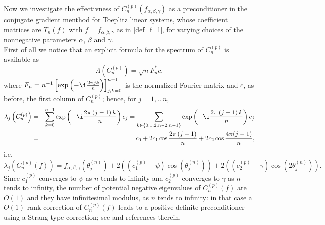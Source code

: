\documentclass{article}
\begin{document}
Now we investigate the effectivness of $ C_{ n }^{ \left( p \right) }(f_{ \alpha, \beta, \gamma }) $ as a preconditioner in the conjugate gradient menthod for Toeplitz linear systems, whose coefficient matrices are $T_n(f)$ with $ f = f_{ \alpha, \beta, \gamma } $ as in \eqref{def_f_1}, for varying choices of the nonnegative parameters $ \alpha $, $ \beta $ and $ \gamma $. \\
First of all we notice that an explicit formula for the spectrum of $ C_{ n }^{ \left( p \right) } $ is available as
\begin{equation*}
	\Lambda \left( C_{ n }^{ \left( p \right) } \right) = \sqrt{ n } F_{ n }^{ * } c,
\end{equation*}
where $ F_{ n } = n^{ -1 } \left[ \exp \left( - \i \frac{ 2 \pi j k }{ n } \right) \right]_{ j, k = 0 }^{ n - 1 } $ is the normalized Fourier matrix and $ c $, as before, the first column of $ C_{ n }^{ \left( p \right) } $; hence, for $ j = 1, \dots n $,
\begin{eqnarray*}
	\lambda_{ j } \left( C_{ n }^{ \left( p \right) } \right) & = & \sum_{ k = 0 }^{ n - 1 } \exp \left( - \i \frac{ 2 \pi \left( j - 1 \right) k }{ n } \right) c_{ j } = \sum_{ k \in \left\lbrace 0, 1, 2, n - 2, n - 1 \right\rbrace } \exp \left( - \i \frac{ 2 \pi \left( j - 1 \right) k }{ n } \right) c_{ j } \\
																														& = & c_{ 0 } + 2 c_{ 1 } \cos \frac{ 2 \pi \left( j - 1 \right) }{ n } + 2 c_{ 2 } \cos \frac{ 4 \pi (j-1) }{ n },
\end{eqnarray*}
i.e.
\begin{equation}\label{spett_C}
\lambda_{ j } \left( C_{ n }^{ \left( p \right) }(f) \right) = f_{ \alpha, \beta, \gamma }(\theta_j^{ \left( n \right) })+
2\left((c_{ 1 }^{ \left( p \right) }-\psi)\cos\left(\theta_j^{ \left( n \right) }\right)\right) +
2\left((c_{ 2 }^{ \left( p \right) }-\gamma)\cos\left(2\theta_j^{ \left( n \right) }\right)\right).
\end{equation}
Since $c_{ 1 }^{ \left( p \right) }$ converges to $\psi$ as $n$ tends to infinity and $c_{ 2 }^{ \left( p \right) }$ converges to $\gamma$ as $n$ tends to infinity, the number of potential negative eigenvalues of $C_{ n }^{ \left( p \right) }(f)$ are $O(1)$ and they have infinitesimal modulus, as $n$ tends to infinity: in that case a $O(1)$ rank correction of $C_{ n }^{ \left( p \right) }(f)$ leads to a positive definite preconditioner using a Strang-type correction; see \cite{CN-Sirev} and references therein.
\end{document}
